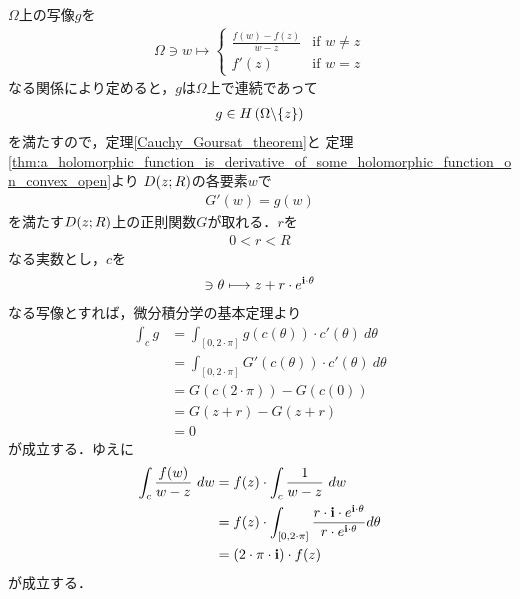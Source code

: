 	\begin{sketch}
		$\Omega$上の写像$g$を
		\begin{align}
			\Omega \ni w \longmapsto
			\begin{cases}
				\displaystyle{\frac{f(w) - f(z)}{w - z}} & \mbox{if } w \neq z \\
				f'(z) & \mbox{if } w = z
			\end{cases}
		\end{align}
		なる関係により定めると，$g$は$\Omega$上で連続であって
		\begin{align}
			g \in H\left(\Omega \backslash \{z\}\right)
		\end{align}
		を満たすので，定理\ref{Cauchy_Goursat_theorem}と
		定理\ref{thm:a_holomorphic_function_is_derivative_of_some_holomorphic_function_on_convex_open}より
		$D(z;R)$の各要素$w$で
		\begin{align}
			G'(w) = g(w)
		\end{align}
		を満たす$D(z;R)$上の正則関数$G$が取れる．$r$を
		\begin{align}
			0 < r < R
		\end{align}
		なる実数とし，$c$を
		\begin{align}
			[0,2 \cdot \pi] \ni \theta \longmapsto z + r \cdot e^{\isym \cdot \theta}
		\end{align}
		なる写像とすれば，微分積分学の基本定理より
		\begin{align}
			\int_{c} g
			&= \int_{[0,2 \cdot \pi]} g(c(\theta)) \cdot c'(\theta)\ d\theta \\
			&= \int_{[0,2 \cdot \pi]} G'(c(\theta)) \cdot c'(\theta)\ d\theta \\
			&= G(c(2 \cdot \pi)) - G(c(0)) \\
			&= G(z + r) - G(z + r) \\
			&= 0
		\end{align}
		が成立する．ゆえに
		\begin{align}
			\int_{c} \frac{f(w)}{w - z}\ dw 
			&= f(z) \cdot \int_{c} \frac{1}{w - z}\ dw \\
			&= f(z) \cdot \int_{[0,2\cdot\pi]} \frac{r \cdot \mathbf{i} \cdot e^{\mathbf{i} \cdot \theta}}{r \cdot e^{\mathbf{i} \cdot \theta}} d\theta \\
			&= (2 \cdot \pi \cdot \mathbf{i}) \cdot f(z)
		\end{align}
		が成立する．
		\QED
	\end{sketch}
	